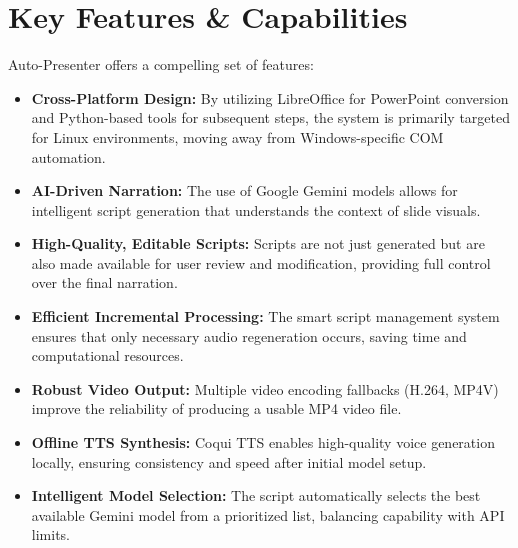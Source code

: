 \documentclass{article}
\begin{document}
\section{Key Features & Capabilities}
Auto-Presenter offers a compelling set of features:
\begin{itemize}
    \item \textbf{Cross-Platform Design:} By utilizing LibreOffice for PowerPoint conversion and Python-based tools for subsequent steps, the system is primarily targeted for Linux environments, moving away from Windows-specific COM automation.
    \item \textbf{AI-Driven Narration:} The use of Google Gemini models allows for intelligent script generation that understands the context of slide visuals.
    \item \textbf{High-Quality, Editable Scripts:} Scripts are not just generated but are also made available for user review and modification, providing full control over the final narration.
    \item \textbf{Efficient Incremental Processing:} The smart script management system ensures that only necessary audio regeneration occurs, saving time and computational resources.
    \item \textbf{Robust Video Output:} Multiple video encoding fallbacks (H.264, MP4V) improve the reliability of producing a usable MP4 video file.
    \item \textbf{Offline TTS Synthesis:} Coqui TTS enables high-quality voice generation locally, ensuring consistency and speed after initial model setup.
    \item \textbf{Intelligent Model Selection:} The script automatically selects the best available Gemini model from a prioritized list, balancing capability with API limits.
\end{itemize}
\end{document}
